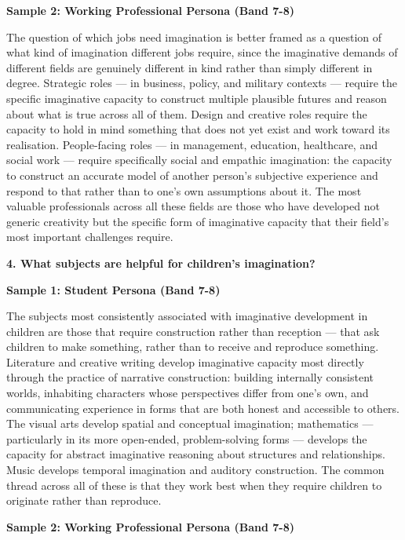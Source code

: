 \textbf{Sample 2: Working Professional Persona (Band 7-8)}

The question of which jobs need imagination is better framed as a question of what kind of imagination different jobs require, since the imaginative demands of different fields are genuinely different in kind rather than simply different in degree. Strategic roles — in business, policy, and military contexts — require the specific imaginative capacity to construct multiple plausible futures and reason about what is true across all of them. Design and creative roles require the capacity to hold in mind something that does not yet exist and work toward its realisation. People-facing roles — in management, education, healthcare, and social work — require specifically social and empathic imagination: the capacity to construct an accurate model of another person's subjective experience and respond to that rather than to one's own assumptions about it. The most valuable professionals across all these fields are those who have developed not generic creativity but the specific form of imaginative capacity that their field's most important challenges require.

\separator

\begin{ieltsquestion}
\textbf{4. What subjects are helpful for children's imagination?}
\end{ieltsquestion}
\textbf{Sample 1: Student Persona (Band 7-8)}

The subjects most consistently associated with imaginative development in children are those that require construction rather than reception — that ask children to make something, rather than to receive and reproduce something. Literature and creative writing develop imaginative capacity most directly through the practice of narrative construction: building internally consistent worlds, inhabiting characters whose perspectives differ from one's own, and communicating experience in forms that are both honest and accessible to others. The visual arts develop spatial and conceptual imagination; mathematics — particularly in its more open-ended, problem-solving forms — develops the capacity for abstract imaginative reasoning about structures and relationships. Music develops temporal imagination and auditory construction. The common thread across all of these is that they work best when they require children to originate rather than reproduce.

\textbf{Sample 2: Working Professional Persona (Band 7-8)}


